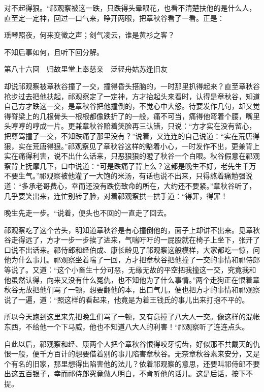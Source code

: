 \documentclass[12pt,UTF8]{ctexbook}
\begin{document}
{{{对不起得狠。“祁观察被这一跌，只跌得头晕眼花，也看不清楚扶他的是什么人，直至定一定神，回过一口气来，睁开两眼，把章秋谷看了一看。正是：

瑶琴照夜，何来变徵之声；剑气凌云，谁是黄衫之客？

不知后事如何，且听下回分解。





第八十六回　归故里堂上奉慈亲　泛轻舟姑苏逢旧友





却说祁观察被章秋谷撞了一交，撞得昏头搭脑的，一时那里扒得起来？直至章秋谷抢步过去把他扶起，祁观察定了一定神，方才抬起头来看时，认得是章秋谷，知道自己方才跌这一交，是章秋谷把他撞倒的，不觉心中大怒。待要发作几句，却又觉得脊梁上的几根骨头一根根都像跌折了的一般，痛不可当，痛得他弯着个腰，嘴里头哼哼的哼成一片。更兼章秋谷赔着笑脸再三认错，只说：“方才实在没有留心，把尊驾撞了一交，不知跌痛了那里没有？”说着，又连连的自己说道：“实在荒唐得狠，实在荒唐得狠。”祁观察见了章秋谷这样的赔着小心，一时发作不出，更兼背上实在痛得利害，说不出什么话来，只恶狠狠的瞪了秋谷一个白眼。秋谷假意在祁观察背上抚摩几下，口中说道：“可是跌痛了背上么？这都是晚生不好，老先生千万不要生气。”祁观察被他灌了一大饱的米汤，有话也说不出来，只得熬着痛勉强说道：“多承老哥费心，幸而还没有跌伤致命的所在，大约还不要紧。”章秋谷听了，几乎要笑出来，连忙别转了脸，对着祁观察拱一拱手道：“得罪，得罪！

晚生先走一步。“说着，便头也不回的一直走了回去。

祁观察吃了这个苦头，明知道章秋谷是有心撞倒他的，面子上却讲不出来。见章秋谷走得远了，方才一步一步挨了进来，气喘吁吁的一屁股就在椅子上坐下，张开了口说不出话来。祁侍郎和经伯成、康长龄见了祁观察这般模样，大家都吃一惊，问他为什么事儿。祁观察坐着喘了一回，方才把章秋谷把他撞了一交的事情和祁侍郎等说了。又道：“这个小畜生十分可恶，无缘无故的平空把我撞这一交，究竟我和他虽然认得，向来又没有什么冤仇，也不知他为了什么事情。”两个走狗正在恨着章秋谷无故把他们骂了一顿，想要翻他的本，出口气儿，便也把方才的事情和祁观察说了一遍，道：“照这样的看起来，他竟是为着王钱氏的事儿出来打抱不平的。

所以今天跑到这里来先把晚生们骂了一顿，又有意撞了八大人一交。像这样的混帐东西，不给他一个下马威，他也不知道八大人的利害！“祁观察听了连连点头。

自此以后，祁观察和经、康两个人把个章秋谷恨得咬牙切齿，好似那不共戴天的仇恨一般，便千方百计的想要借着别的事儿陷害章秋谷。无奈章秋谷素来安分，又是个有名的旧家，那里想得出陷害他的法儿？依着祁观察的意思，还要叫祁侍郎不要出这五百银子，幸而祁侍郎究竟做人明白，不肯听他的话儿。这是后话，按下不提。

}}}
\end{document}
